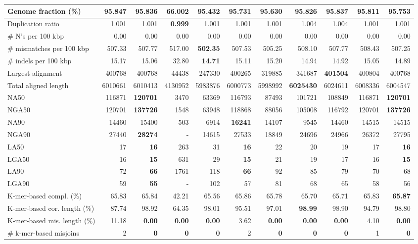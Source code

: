 \documentclass[12pt,a4paper]{article}
\begin{document}
\begin{table}[ht]
\begin{center}
\begin{tabular}{|l*{10}{|r}|}
Genome fraction (\%) & {\bf 95.847} & 95.836 & 66.002 & 95.432 & 95.731 & 95.630 & 95.826 & 95.837 & 95.811 & 95.753 \\ \hline
Duplication ratio & 1.001 & 1.001 & {\bf 0.999} & 1.001 & 1.001 & 1.001 & 1.004 & 1.004 & 1.001 & 1.001 \\ \hline
\# N's per 100 kbp & 0.00 & 0.00 & 0.00 & 0.00 & 0.00 & 0.00 & 0.00 & 0.00 & 0.00 & 0.00 \\ \hline
\# mismatches per 100 kbp & 507.33 & 507.77 & 517.00 & {\bf 502.35} & 507.53 & 505.25 & 508.10 & 507.77 & 508.43 & 507.25 \\ \hline
\# indels per 100 kbp & 15.17 & 15.06 & 32.80 & {\bf 14.71} & 15.11 & 15.20 & 14.94 & 14.92 & 15.05 & 14.89 \\ \hline
Largest alignment & 400768 & 400768 & 44438 & 247330 & 400265 & 319885 & 341687 & {\bf 401504} & 400804 & 400768 \\ \hline
Total aligned length & 6010661 & 6010413 & 4130952 & 5983876 & 6000773 & 5998992 & {\bf 6025430} & 6024611 & 6008336 & 6004547 \\ \hline
NA50 & 116871 & {\bf 120701} & 3470 & 63369 & 116793 & 87493 & 101721 & 108849 & 116871 & {\bf 120701} \\ \hline
NGA50 & 120701 & {\bf 137726} & 1548 & 63948 & 118868 & 88056 & 105008 & 116792 & 120701 & {\bf 137726} \\ \hline
NA90 & 14460 & 15400 & 503 & 6914 & {\bf 16241} & 14107 & 9545 & 14460 & 14515 & 14515 \\ \hline
NGA90 & 27440 & {\bf 28274} & - & 14615 & 27533 & 18849 & 24696 & 24966 & 26372 & 27795 \\ \hline
LA50 & 17 & {\bf 16} & 263 & 31 & {\bf 16} & 22 & 20 & 19 & 17 & {\bf 16} \\ \hline
LGA50 & 16 & {\bf 15} & 631 & 29 & {\bf 15} & 21 & 19 & 17 & 16 & {\bf 15} \\ \hline
LA90 & 72 & {\bf 66} & 1761 & 118 & {\bf 66} & 92 & 85 & 79 & 70 & 68 \\ \hline
LGA90 & 59 & {\bf 55} & - & 102 & 57 & 81 & 68 & 65 & 58 & 56 \\ \hline
K-mer-based compl. (\%) & 65.83 & 65.84 & 42.21 & 65.56 & 65.86 & 65.78 & 65.70 & 65.71 & 65.83 & {\bf 65.87} \\ \hline
K-mer-based cor. length (\%) & 87.74 & 98.92 & 64.35 & 98.01 & 95.51 & 97.01 & {\bf 98.99} & 98.90 & 94.79 & 98.80 \\ \hline
K-mer-based mis. length (\%) & 11.18 & {\bf 0.00} & {\bf 0.00} & {\bf 0.00} & 3.62 & {\bf 0.00} & {\bf 0.00} & {\bf 0.00} & 4.10 & {\bf 0.00} \\ \hline
\# k-mer-based misjoins & 2 & {\bf 0} & {\bf 0} & {\bf 0} & 2 & {\bf 0} & {\bf 0} & {\bf 0} & 1 & {\bf 0} \\ \hline
\end{tabular}
\end{center}
\end{table}
\end{document}
